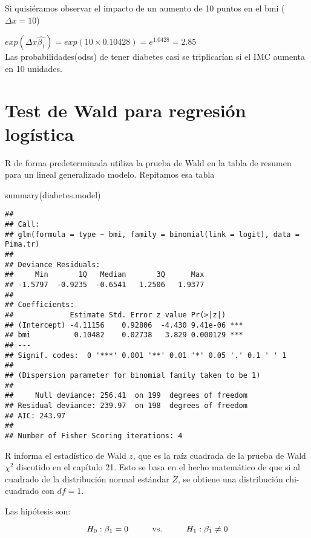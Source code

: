 \documentclass[
]{book}
\newenvironment{Shaded}{\begin{snugshade}}{\end{snugshade}}
\newcommand{\FunctionTok}[1]{\textcolor[rgb]{0.00,0.00,0.00}{#1}}
\newcommand{\NormalTok}[1]{#1}
\begin{document}
Si quisiéramos observar el impacto de un aumento de 10 puntos en el bmi (\(\Delta x=10\))

\(exp(\Delta x \hat{\beta_1} ) = exp(10\times 0.10428) = e^{1.0428} = 2.85\)\\
Las probabilidades(odss) de tener diabetes casi se triplicarían si el IMC aumenta en 10 unidades.

\hypertarget{test-de-wald-para-regresiuxf3n-loguxedstica}{%
\chapter{Test de Wald para regresión logística}\label{test-de-wald-para-regresiuxf3n-loguxedstica}}

R de forma predeterminada utiliza la prueba de Wald en la tabla de resumen para un lineal generalizado modelo. Repitamos esa tabla

\begin{Shaded}
\begin{Highlighting}[]
\FunctionTok{summary}\NormalTok{(diabetes.model)}
\end{Highlighting}
\end{Shaded}

\begin{verbatim}
## 
## Call:
## glm(formula = type ~ bmi, family = binomial(link = logit), data = Pima.tr)
## 
## Deviance Residuals: 
##     Min       1Q   Median       3Q      Max  
## -1.5797  -0.9235  -0.6541   1.2506   1.9377  
## 
## Coefficients:
##             Estimate Std. Error z value Pr(>|z|)    
## (Intercept) -4.11156    0.92806  -4.430 9.41e-06 ***
## bmi          0.10482    0.02738   3.829 0.000129 ***
## ---
## Signif. codes:  0 '***' 0.001 '**' 0.01 '*' 0.05 '.' 0.1 ' ' 1
## 
## (Dispersion parameter for binomial family taken to be 1)
## 
##     Null deviance: 256.41  on 199  degrees of freedom
## Residual deviance: 239.97  on 198  degrees of freedom
## AIC: 243.97
## 
## Number of Fisher Scoring iterations: 4
\end{verbatim}

R informa el estadístico de Wald \(z\), que es la raíz cuadrada de la prueba de Wald \(\chi^2\)
discutido en el capítulo 21. Esto se basa en el hecho matemático de que si
al cuadrado de la distribución normal estándar \(Z\), se obtiene una distribución chi-cuadrado
con \(df=1\).

Las hipótesis son:

\begin{equation}
H_0:\beta_{1}=0  \hspace{1cm} \textup{vs.}  \hspace{1cm} H_1:\beta_{1}\not= 0
\end{equation}
\end{document}
